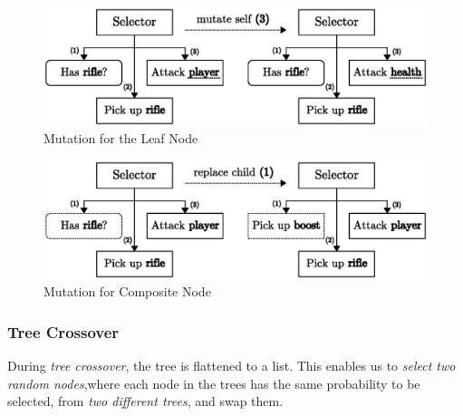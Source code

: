 \documentclass[a4paper, twocolumn]{article}
\begin{document}
        \begin{figure}[H]
            \centering
            \includegraphics[width=\linewidth]{share/leaf_mutation.eps}
            \caption{Mutation for the Leaf Node}
            \label{fig:leaf_mutation}
        \end{figure}

        \begin{figure}[H]
            \centering
            \includegraphics[width=\linewidth]{share/child_replacement.eps}
            \caption{Mutation for Composite Node}
            \label{fig:child_replacement}
        \end{figure}

        \subsubsection*{Tree Crossover}

        During \emph{tree crossover}, the tree is flattened to a list. This enables us to \emph{select two random nodes},where each node in the trees has the same probability to be selected, from \emph{two different trees}, and swap them.
\end{document}

